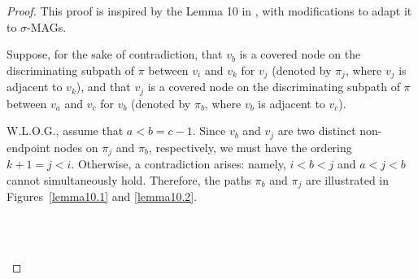 \documentclass[accepted]{uai2025} %
\begin{document}
\lemmaten*
\begin{proof}
This proof is inspired by the Lemma 10 in \citep{spirtes1996polynomial}, with modifications to adapt it to \( \sigma \)-MAGs.

Suppose, for the sake of contradiction, that \( v_b \) is a covered node on the discriminating subpath of \( \pi \) between \( v_i \) and \( v_k \) for \( v_j \) (denoted by \( \pi_j \), where \( v_j \) is adjacent to \( v_k \)), and that \( v_j \) is a covered node on the discriminating subpath of \( \pi \) between \( v_a \) and \( v_c \) for \( v_b \) (denoted by \( \pi_b \), where \( v_b \) is adjacent to \( v_c \)).

W.L.O.G., assume that $a < b = c - 1$. Since $v_b$ and $v_j$ are two distinct non-endpoint nodes on $\pi_j$ and $\pi_b$, respectively, we must have the ordering $k+1 = j < i$. Otherwise, a contradiction arises: namely, $i < b < j$ and $a < j < b$ cannot simultaneously hold. Therefore, the paths $\pi_b$ and $\pi_j$ are illustrated in Figures~\ref{lemma10.1} and \ref{lemma10.2}.

\begin{figure}[t]
    \centering
    \\

    \\


\end{figure}
\end{proof}
\end{document}
